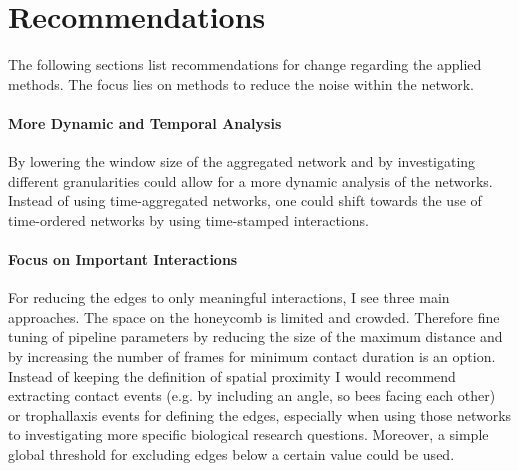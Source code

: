 \section{Recommendations}
The following sections list recommendations for change regarding the applied methods. The focus lies on methods to reduce the noise within the network.


\paragraph{More Dynamic and Temporal Analysis}
By lowering the window size of the aggregated network and by investigating different granularities could allow for a more dynamic analysis of the networks. Instead of using time-aggregated networks, one could shift towards the use of time-ordered networks by using time-stamped interactions.

\paragraph{Focus on Important Interactions}
For reducing the edges to only meaningful interactions, I see three main approaches.
The space on the honeycomb is limited and crowded. Therefore fine tuning of pipeline parameters by reducing the size of the maximum distance and by increasing the number of frames for minimum contact duration is an option.
Instead of keeping the definition of spatial proximity I would recommend extracting contact events (e.g. by including an angle, so bees facing each other) or trophallaxis events for defining the edges, especially when using those networks to investigating more specific biological research questions.
Moreover, a simple global threshold for excluding edges below a certain value could be used.

